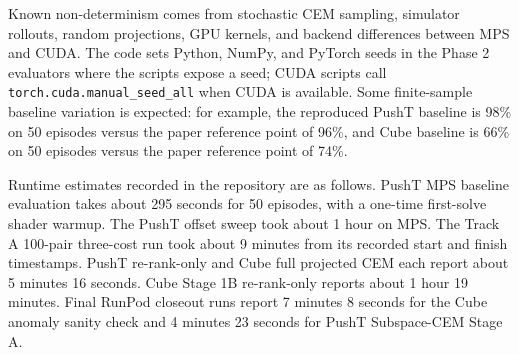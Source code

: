 Known non-determinism comes from stochastic CEM sampling, simulator rollouts,
random projections, GPU kernels, and backend differences between MPS and CUDA.
The code sets Python, NumPy, and PyTorch seeds in the Phase 2 evaluators where
the scripts expose a seed; CUDA scripts call \texttt{torch.cuda.manual\_seed\_all}
when CUDA is available. Some finite-sample baseline variation is expected: for
example, the reproduced PushT baseline is 98\% on 50 episodes versus the paper
reference point of 96\%, and Cube baseline is 66\% on 50 episodes versus the
paper reference point of 74\%.

Runtime estimates recorded in the repository are as follows. PushT MPS baseline
evaluation takes about 295 seconds for 50 episodes, with a one-time first-solve
shader warmup. The PushT offset sweep took about 1 hour on MPS. The Track A
100-pair three-cost run took about 9 minutes from its recorded start and finish
timestamps. PushT re-rank-only and Cube full projected CEM each report about
5 minutes 16 seconds. Cube Stage 1B re-rank-only reports about 1 hour 19
minutes. Final RunPod closeout runs report 7 minutes 8 seconds for the Cube
anomaly sanity check and 4 minutes 23 seconds for PushT Subspace-CEM Stage A.
